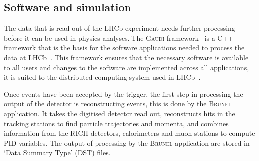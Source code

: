
\subsection{Software and simulation}
\label{SoftwareSimulation}

The data that is read out of the LHCb experiment needs further processing before it can be used in physics analyses. The \textsc{Gaudi} framework~\cite{Mato:1998gfa} is a C++ framework that is the basis for the software applications needed to process the data at LHCb~\cite{Antunes-Nobrega:835156}. This framework ensures that the necessary software is available to all users and changes to the software are implemented across all applications, it is suited to the distributed computing system used in LHCb~\cite{Stagni:2012rs}. 


Once events have been accepted by the trigger, the first step in processing the output of the detector is reconstructing events, this is done by the \textsc{Brunel} application. It takes the digitised detector read out, reconstructs hits in the tracking stations to find particle trajectories and momenta, and combines information from the RICH detectors, calorimeters and muon stations to compute PID variables. The output of processing by the \textsc{Brunel} application are stored in `Data Summary Type' (DST) files. 

